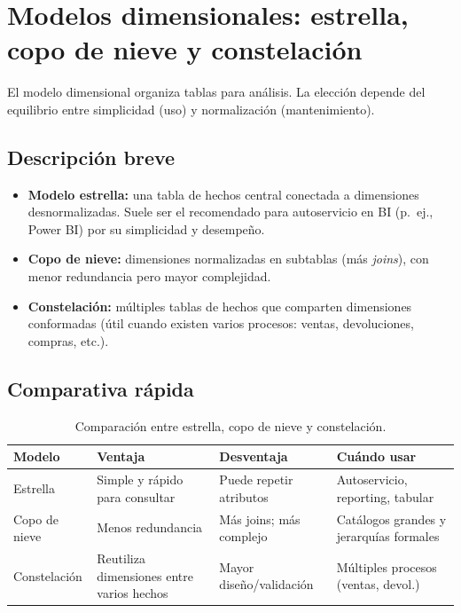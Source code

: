 \documentclass[12pt]{article}
\begin{document}
\section{Modelos dimensionales: estrella, copo de nieve y constelación}
El modelo dimensional organiza tablas para análisis. La elección depende del equilibrio entre simplicidad (uso) y normalización (mantenimiento).

\subsection*{Descripción breve}
\begin{itemize}[leftmargin=*, itemsep=0.25em]
  \item \textbf{Modelo estrella:} una tabla de hechos central conectada a dimensiones desnormalizadas. Suele ser el recomendado para autoservicio en BI (p.\ ej., Power BI) por su simplicidad y desempeño.
  \item \textbf{Copo de nieve:} dimensiones normalizadas en subtablas (más \textit{joins}), con menor redundancia pero mayor complejidad.
  \item \textbf{Constelación:} múltiples tablas de hechos que comparten dimensiones conformadas (útil cuando existen varios procesos: ventas, devoluciones, compras, etc.).
\end{itemize}

\subsection*{Comparativa rápida}
\begin{table}[h]
\centering
\begin{tabular}{@{}p{2.3cm}p{4.1cm}p{4.1cm}p{4.1cm}@{}}
\toprule
\textbf{Modelo} & \textbf{Ventaja} & \textbf{Desventaja} & \textbf{Cuándo usar} \\
\midrule
Estrella & Simple y rápido para consultar & Puede repetir atributos & Autoservicio, reporting, tabular \\
Copo de nieve & Menos redundancia & Más joins; más complejo & Catálogos grandes y jerarquías formales \\
Constelación & Reutiliza dimensiones entre varios hechos & Mayor diseño/validación & Múltiples procesos (ventas, devol.) \\
\bottomrule
\end{tabular}
\caption{Comparación entre estrella, copo de nieve y constelación.}
\end{table}
\end{document}
